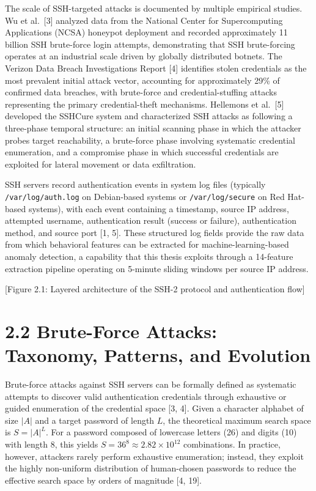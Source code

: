 \documentclass[
  a4paper]{report}
\begin{document}
The scale of SSH-targeted attacks is documented by multiple empirical
studies. Wu et al.~{[}3{]} analyzed data from the National Center for
Supercomputing Applications (NCSA) honeypot deployment and recorded
approximately 11 billion SSH brute-force login attempts, demonstrating
that SSH brute-forcing operates at an industrial scale driven by
globally distributed botnets. The Verizon Data Breach Investigations
Report {[}4{]} identifies stolen credentials as the most prevalent
initial attack vector, accounting for approximately 29\% of confirmed
data breaches, with brute-force and credential-stuffing attacks
representing the primary credential-theft mechanisms. Hellemons et
al.~{[}5{]} developed the SSHCure system and characterized SSH attacks
as following a three-phase temporal structure: an initial scanning phase
in which the attacker probes target reachability, a brute-force phase
involving systematic credential enumeration, and a compromise phase in
which successful credentials are exploited for lateral movement or data
exfiltration.

SSH servers record authentication events in system log files (typically
\texttt{/var/log/auth.log} on Debian-based systems or
\texttt{/var/log/secure} on Red Hat-based systems), with each event
containing a timestamp, source IP address, attempted username,
authentication result (success or failure), authentication method, and
source port {[}1, 5{]}. These structured log fields provide the raw data
from which behavioral features can be extracted for
machine-learning-based anomaly detection, a capability that this thesis
exploits through a 14-feature extraction pipeline operating on 5-minute
sliding windows per source IP address.

{[}Figure 2.1: Layered architecture of the SSH-2 protocol and
authentication flow{]}

\section{2.2 Brute-Force Attacks: Taxonomy, Patterns, and
Evolution}\label{brute-force-attacks-taxonomy-patterns-and-evolution}

Brute-force attacks against SSH servers can be formally defined as
systematic attempts to discover valid authentication credentials through
exhaustive or guided enumeration of the credential space {[}3, 4{]}.
Given a character alphabet of size \(|A|\) and a target password of
length \(L\), the theoretical maximum search space is \(S = |A|^L\). For
a password composed of lowercase letters (26) and digits (10) with
length 8, this yields \(S = 36^8 \approx 2.82 \times 10^{12}\)
combinations. In practice, however, attackers rarely perform exhaustive
enumeration; instead, they exploit the highly non-uniform distribution
of human-chosen passwords to reduce the effective search space by orders
of magnitude {[}4, 19{]}.
\end{document}
